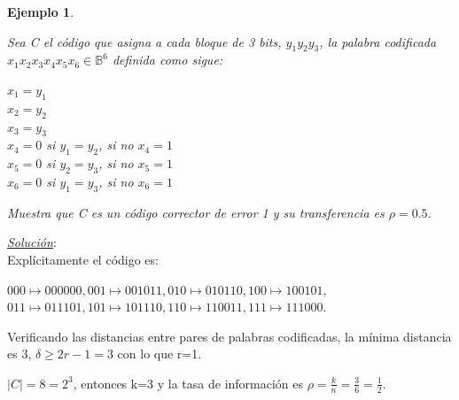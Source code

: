 \documentclass{beamer}
\theoremstyle{plain}
\theoremstyle{example}
\theoremstyle{example}
\newtheorem{ejemplo} [Ejemplo] {Ejemplo}
\begin{document}
\begin{frame}  \small  

\begin{ejemplo}\label{ej:bloqueCodigo}

Sea C el código que asigna a cada bloque de 3 bits, $y_1y_2y_3$, la palabra codificada $x_1x_2x_3x_4x_5x_6 \in \mathbb{B}^6$ definida como sigue:

\begin{center}
$x_1 = y_1$\\
$x_2 = y_2$\\
$x_3 = y_3$\\
$x_4 =0$ si $y_1 =y_2$, si no $x_4 =1$\\
$x_5 =0$ si $y_2 =y_3$, si no $x_5 =1$\\
$x_6 =0$ si $y_1 =y_3$, si no $x_6 =1$\\
\end{center}

Muestra que C es un código corrector de error 1 y su transferencia es $\rho = 0.5$.\\
\end{ejemplo}

\end{frame} 

\begin{frame}  \small  
\textit{\underline{Solución}}:\\
\vspace{0.3cm}
Explícitamente el código es:

\begin{center}
$000 \mapsto 000 000,	001 \mapsto 001 011,	010 \mapsto 010 110,	100 \mapsto 100 101, $\\
$011 \mapsto 011 101,	101 \mapsto 101 110,	110 \mapsto 110 011,	111 \mapsto 111 000.$
\end{center}

Verificando las distancias entre pares de palabras codificadas, la mínima distancia es 3, $\delta \geq 2r-1 =3$ con lo que r=1.
\vspace{0.3cm}

\(|C|=8=2^3\), entonces k=3 y la tasa de información es \(\rho=\frac{k}{n}=\frac{3}{6}=\tfrac12\).

\end{frame} 


\end{document}
